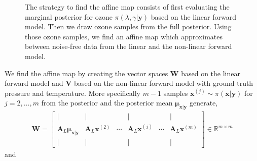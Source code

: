 \begin{figure}[htb!]
	\centering
	\caption[Strategy to find affine map.]{The strategy to find the affine map consists of first evaluating the marginal posterior for ozone $\pi(\lambda , \gamma  | \bm{y})$ based on the linear forward model. Then we draw ozone samples from the full posterior. Using those ozone samples, we find an affine map which approximates between noise-free data from the linear and the non-linear forward model.}
	\label{fig:affinStrat}
\end{figure}
We find the affine map by creating the vector spaces $\bm{W}$ based on the linear forward model and $\bm{V}$ based on the non-linear forward model with ground truth pressure and temperature.
More specifically $m-1$ samples $\bm{x}^{(j)} \sim \pi(\bm{x}|\bm{y})$ for $j = 2, \dots,m$ from the posterior and the posterior mean $\bm{\mu}_{\bm{x}|\bm{y}}$ generate,
\begin{align}
	\bm{W} = \begin{bmatrix}
		\vert& \vert&   &  \vert & & \vert \\
		\bm{A}_{L}  \bm{\mu}_{\bm{x}|\bm{y}} & \bm{A}_{L}  \bm{x}^{(2)}   &  \cdots& \bm{A}_{L} \bm{x}^{(j)} &  \cdots & \bm{A}_{L} \bm{x}^{(m)} \\
		\vert& \vert&   &  \vert & & \vert 
	\end{bmatrix}
	\in \mathbb{R}^{m \times m}
\end{align}\noindent and
